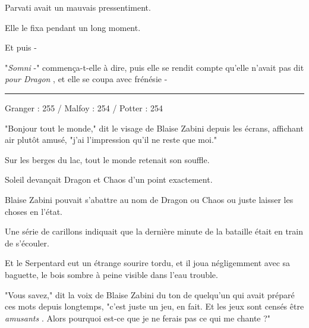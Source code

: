Parvati avait un mauvais pressentiment.

Elle le fixa pendant un long moment.

Et puis -

"\emph{Somni} -" commença-t-elle à dire, puis elle se rendit compte qu'elle n'avait pas dit \emph{pour Dragon} , et elle se coupa avec frénésie -
\par\noindent\rule{\textwidth}{0.4pt}
Granger : 255 / Malfoy : 254 / Potter : 254

"Bonjour tout le monde," dit le visage de Blaise Zabini depuis les écrans, affichant air plutôt amusé, "j'ai l'impression qu'il ne reste que moi."

Sur les berges du lac, tout le monde retenait son souffle.

Soleil devançait Dragon et Chaos d'un point exactement.

Blaise Zabini pouvait s'abattre au nom de Dragon ou Chaos ou juste laisser les choses en l'état.

Une série de carillons indiquait que la dernière minute de la bataille était en train de s'écouler.

Et le Serpentard eut un étrange sourire tordu, et il joua négligemment avec sa baguette, le bois sombre à peine visible dans l'eau trouble.

"Vous savez," dit la voix de Blaise Zabini du ton de quelqu'un qui avait préparé ces mots depuis longtemps, "c'est juste un jeu, en fait. Et les jeux sont censés être \emph{amusants} . Alors pourquoi est-ce que je ne ferais pas ce qui me chante ?"

